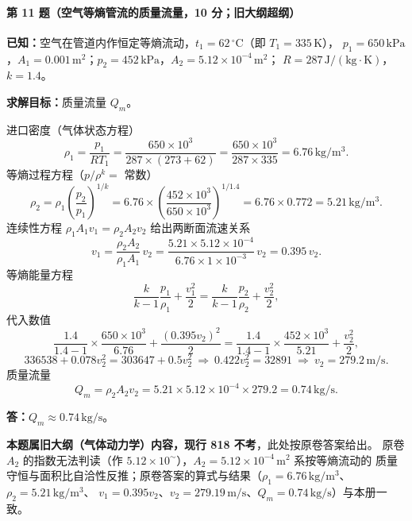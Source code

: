 \paragraph{第 11 题（空气等熵管流的质量流量，10 分；旧大纲超纲）}
\begin{jie}
\textbf{已知：}空气在管道内作恒定等熵流动，$t_1=62\,^{\circ}\mathrm{C}$（即 $T_1=335\,\mathrm{K}$），
$p_1=650\,\mathrm{kPa}$，$A_1=0.001\,\mathrm{m^2}$；$p_2=452\,\mathrm{kPa}$，$A_2=5.12\times10^{-4}\,\mathrm{m^2}$；
$R=287\,\mathrm{J/(kg\cdot K)}$，$k=1.4$。

\textbf{求解目标：}质量流量 $Q_m$。

进口密度（气体状态方程）
\[
\rho_1=\frac{p_1}{RT_1}=\frac{650\times10^{3}}{287\times(273+62)}
=\frac{650\times10^{3}}{287\times335}=6.76\,\mathrm{kg/m^3}.
\]
等熵过程方程（$p/\rho^{k}=$ 常数）
\[
\rho_2=\rho_1\left(\frac{p_2}{p_1}\right)^{1/k}
=6.76\times\left(\frac{452\times10^{3}}{650\times10^{3}}\right)^{1/1.4}
=6.76\times0.772=5.21\,\mathrm{kg/m^3}.
\]
连续性方程 $\rho_1A_1v_1=\rho_2A_2v_2$ 给出两断面流速关系
\[
v_1=\frac{\rho_2A_2}{\rho_1A_1}\,v_2
=\frac{5.21\times5.12\times10^{-4}}{6.76\times1\times10^{-3}}\,v_2=0.395\,v_2 .
\]
等熵能量方程
\[
\frac{k}{k-1}\frac{p_1}{\rho_1}+\frac{v_1^{2}}{2}
=\frac{k}{k-1}\frac{p_2}{\rho_2}+\frac{v_2^{2}}{2},
\]
代入数值
\[
\frac{1.4}{1.4-1}\times\frac{650\times10^{3}}{6.76}+\frac{(0.395v_2)^{2}}{2}
=\frac{1.4}{1.4-1}\times\frac{452\times10^{3}}{5.21}+\frac{v_2^{2}}{2},
\]
\[
336538+0.078v_2^{2}=303647+0.5v_2^{2}
\ \Longrightarrow\
0.422v_2^{2}=32891
\ \Longrightarrow\
v_2=279.2\,\mathrm{m/s}.
\]
质量流量
\[
Q_m=\rho_2A_2v_2=5.21\times5.12\times10^{-4}\times279.2=0.74\,\mathrm{kg/s}.
\]

\textbf{答：}$Q_m\approx0.74\,\mathrm{kg/s}$。
\end{jie}

\begin{tishi}
\textbf{本题属旧大纲（气体动力学）内容，现行 818 不考}，此处按原卷答案给出。
原卷 $A_2$ 的指数无法判读（作 $5.12\times10^{\sim}$），$A_2=5.12\times10^{-4}\,\mathrm{m^2}$ 系按等熵流动的
质量守恒与面积比自洽性反推；原卷答案的算式与结果（$\rho_1=6.76\,\mathrm{kg/m^3}$、$\rho_2=5.21\,\mathrm{kg/m^3}$、
$v_1=0.395v_2$、$v_2=279.19\,\mathrm{m/s}$、$Q_m=0.74\,\mathrm{kg/s}$）与本册一致。
\end{tishi}


